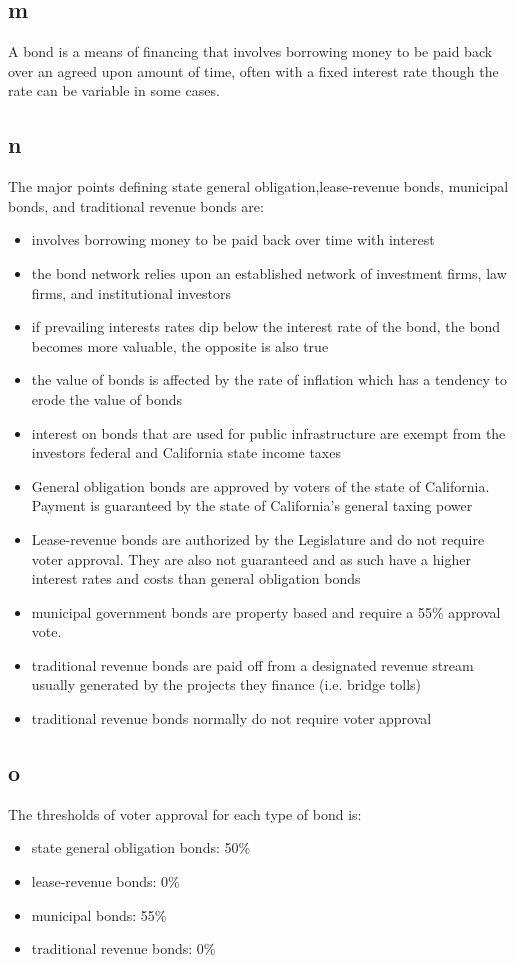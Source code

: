 \documentclass[12pt]{article} %
\begin{document}
	\subsection{m}
		A bond is a means of financing that involves borrowing money to be paid back over an agreed upon amount of time, often with a fixed interest rate though the rate can be variable in some cases.
	
	\subsection{n}
		The major points defining state general obligation,lease-revenue bonds, municipal bonds, and traditional revenue bonds are:
		\begin{itemize}
			\item involves borrowing money to be paid back over time with interest
			\item the bond network relies upon an established network of investment firms, law firms, and institutional investors
			\item if prevailing interests rates dip below the interest rate of the bond, the bond becomes more valuable, the opposite is also true
			\item the value of bonds is affected by the rate of inflation which has a tendency to erode the value of bonds
			\item interest on bonds that are used for public infrastructure are exempt from the investors federal and California state income taxes
			\item General obligation bonds are approved by voters of the state of California. Payment is guaranteed by the state of California's general taxing power
			\item Lease-revenue bonds are authorized by the Legislature and do not require voter approval. They are also not guaranteed and as such have a higher interest rates and costs than general obligation bonds
			\item municipal government bonds are property based and require a 55\% approval vote.
			\item traditional revenue bonds are paid off from a designated revenue stream usually generated by the projects they finance (i.e. bridge tolls)
			\item traditional revenue bonds normally do not require voter approval
		\end{itemize}
	
	\subsection{o}
		The thresholds of voter approval for each type of bond is:
			\begin{itemize}
				\item state general obligation bonds: 50\%
				\item lease-revenue bonds: 0\%
				\item municipal bonds: 55\%
				\item traditional revenue bonds: 0\%
			\end{itemize}
	
\end{document}
